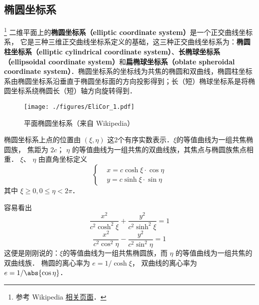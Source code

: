 
\begin{issues}
\end{issues}


\subsection{椭圆坐标系}
\footnote{参考 Wikipedia \href{https://en.wikipedia.org/wiki/Elliptic_coordinate_system}{相关页面}．}
二维平面上的\textbf{椭圆坐标系（elliptic coordinate system）}是一个正交曲线坐标系， 它是三种三维正交曲线坐标系定义的基础，这三种正交曲线坐标系为：\textbf{椭圆柱坐标系（elliptic cylindrical coordinate system）}、\textbf{长椭球坐标系（ellipsoidal coordinate system）}和\textbf{扁椭球坐标系（oblate spheroidal coordinate system）}．椭圆坐标系的坐标线为共焦的椭圆和双曲线，椭圆柱坐标系由椭圆坐标系沿垂直于椭圆坐标面的方向投影得到；长（短）椭球坐标系是将椭圆坐标系绕椭圆长（短）轴方向旋转得到．

\begin{figure}[ht]
\centering
\texttt{[image: ./figures/EliCor\_1.pdf]}
\caption{平面椭圆坐标系（来自 Wikipedia）} \label{EliCor_fig1}
\end{figure}

椭圆坐标系上点的位置由 $(\xi,\eta)$ 这2个有序实数表示．$\xi$的等值曲线为一组共焦椭圆族， 焦距为 $2c$； $\eta$ 的等值曲线为一组共焦的双曲线族，其焦点与椭圆族焦点相重． $\xi$、 $\eta$ 由直角坐标定义
\begin{equation}\label{EliCor_eq3}
\left\{\begin{aligned}
&x=c\cosh\xi\cdot\cos\eta\\
&y=c\sinh\xi\cdot\sin\eta
\end{aligned}\right.
\end{equation}
其中 $\xi\geq0,0\leq\eta<2\pi$．

容易看出
\begin{equation}\label{EliCor_eq4}
\frac{x^2}{c^2\cosh^2\xi}+\frac{y^2}{c^2\sinh^2\xi}=1
\end{equation}
\begin{equation}\label{EliCor_eq5}
\frac{x^2}{c^2\cos^2\eta}-\frac{y^2}{c^2\sin^2\eta}=1
\end{equation}
这便是刚刚说的：$\xi$的等值曲线为一组共焦椭圆族，而 $\eta$ 的等值曲线为一组共焦的双曲线族． 椭圆的离心率为 $e = 1/\cosh \xi$， 双曲线的离心率为 $e = 1/\abs{\cos \eta}$．

